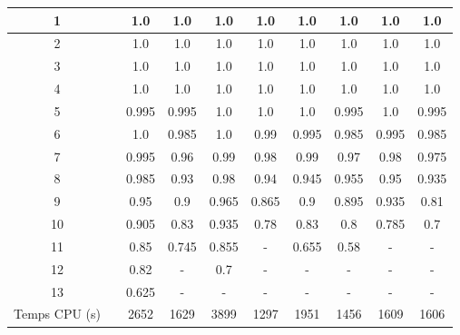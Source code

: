 \documentclass[french,nochapter,11pt]{rapportUB}
\begin{document}
\begin{table}[htbp]
\begin{tabular}{|c|c|c|c|c|c|c|c|c|c|}
          1 &\phantom &1.0	&1.0	&1.0	&1.0	&1.0	&1.0	&1.0	&1.0 \\
          \hline
          2 &\phantom&1.0	&1.0	&1.0 &1.0	&1.0	&1.0	&1.0	&1.0\\
          \hline
          3 &\phantom &1.0	&1.0	&1.0	&1.0	&1.0	&1.0	&1.0	&1.0 \\
          \hline
          4 &\phantom &1.0	&1.0	&1.0	&1.0	&1.0	&1.0	&1.0	&1.0 \\
          \hline
          5 &\phantom &0.995	&0.995	&1.0	&1.0	&1.0	&0.995	&1.0	 &0.995 \\
          \hline
          6 &\phantom &1.0	&0.985 &1.0	&0.99	&0.995	&0.985	&0.995	&0.985 \\
          \hline
          7 &\phantom &0.995	&0.96	&0.99	&0.98	&0.99	&0.97	&0.98	&0.975 \\
          \hline
          8 &\phantom &0.985	&0.93	&0.98	&0.94	&0.945	&0.955	&0.95	&0.935 \\
          \hline
          9 &\phantom &0.95	&0.9	&0.965	&0.865	&0.9	&0.895	&0.935	&0.81 \\
          \hline
          10 &\phantom  &0.905	&0.83	&0.935	&0.78	&0.83	&0.8	&0.785	&0.7 \\
          \hline
          11 &\phantom  &0.85	&0.745	&0.855	&-	&0.655	&0.58	&-	&- \\
          \hline
          12 &\phantom &0.82	&-	&0.7	&-	&-	&-	&-	&- \\
          \hline
          13 &\phantom &0.625	&-	&-	&-	&-	&-	&-	&- \\
          \hline
          Temps CPU (s) &\phantom &2652 &1629	&3899 &1297	&1951	&1456	&1609	&1606\\
          \hline
  \end{tabular}
\end{table}%
\end{document}
